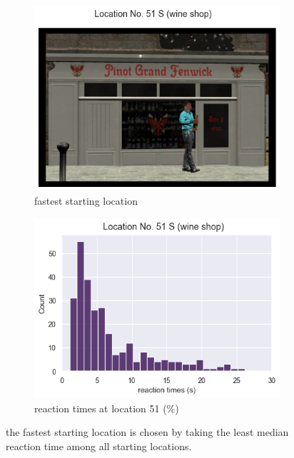 \begin{figure}[!htb]
	\centering
	\begin{subfigure}[b]{0.48\linewidth}
		\includegraphics[width=\linewidth]{figures/fastest_loc_RT_withHA_23.png}
		\caption{fastest starting location}
		\label{fig:fastest_loc}
	\end{subfigure}
	\begin{subfigure}[b]{0.48\linewidth}
		\includegraphics[width=\linewidth]{figures/fastest_loc_RT_dist_51_23.png}
		\caption{reaction times at location 51 (\%)}
		\label{fig:fastest_loc_dist}
	\end{subfigure}
	
	\caption[Fastest starting location]{the fastest starting location is chosen by taking the least median reaction time among all starting locations.}
\end{figure}
\label{fig:fastest_location}


